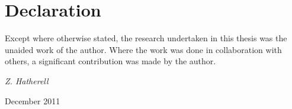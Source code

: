 \chapter*{Declaration}

\normalsize
Except where otherwise stated, the research undertaken in this thesis
was the unaided work of the author. Where the work was done in collaboration
with others, a significant contribution was made by the author.


\vspace{20mm}
\hfill {\it Z. Hatherell}

\hfill December 2011





